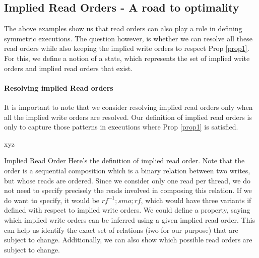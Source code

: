 \subsection{Implied Read Orders - A road to optimality}


    The above examples show us that read orders can also play a role in defining symmetric executions.
    The question however, is whether we can resolve all these read orders while also keeping the implied write orders to respect Prop \ref{prop1}.
    For this, we define a notion of a state, which represents the set of implied write orders and implied read orders that exist.    

    \paragraph{Resolving implied Read orders}

        It is important to note that we consider resolving implied read orders only when all the implied write orders are resolved.
        Our definition of implied read orders is only to capture those patterns in executions where Prop \ref{prop1} is satisfied.
        
    \begin{definition}
        \label{SymReadOrd}
        xyz
    \end{definition}

    \begin{definition}{Implied Read Order}
        \label{ImpReadOrd}
        Here's the definition of implied read order. 
        Note that the order is a sequential composition which is a binary relation between two writes, but whose reads are ordered.
        Since we consider only one read per thread, we do not need to specify precisely the reads involved in composing this relation.
        If we do want to specify, it would be $rf^{-1};smo;rf$, which would have three variants if defined with respect to implied write orders. 
        We could define a property, saying which implied write orders can be inferred using a given implied read order. 
        This can help us identify the exact set of relations (iwo for our purpose) that are subject to change. 
        Additionally, we can also show which possible read orders are subject to change.
    \end{definition}

